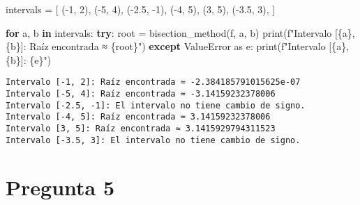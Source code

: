 \documentclass[
  letterpaper,
  DIV=11,
  numbers=noendperiod]{scrartcl}
\newenvironment{Shaded}{\begin{snugshade}}{\end{snugshade}}
\newcommand{\BuiltInTok}[1]{\textcolor[rgb]{0.00,0.23,0.31}{#1}}
\newcommand{\ControlFlowTok}[1]{\textcolor[rgb]{0.00,0.23,0.31}{\textbf{#1}}}
\newcommand{\DecValTok}[1]{\textcolor[rgb]{0.68,0.00,0.00}{#1}}
\newcommand{\FloatTok}[1]{\textcolor[rgb]{0.68,0.00,0.00}{#1}}
\newcommand{\ImportTok}[1]{\textcolor[rgb]{0.00,0.46,0.62}{#1}}
\newcommand{\KeywordTok}[1]{\textcolor[rgb]{0.00,0.23,0.31}{\textbf{#1}}}
\newcommand{\NormalTok}[1]{\textcolor[rgb]{0.00,0.23,0.31}{#1}}
\newcommand{\OperatorTok}[1]{\textcolor[rgb]{0.37,0.37,0.37}{#1}}
\newcommand{\PreprocessorTok}[1]{\textcolor[rgb]{0.68,0.00,0.00}{#1}}
\newcommand{\SpecialCharTok}[1]{\textcolor[rgb]{0.37,0.37,0.37}{#1}}
\newcommand{\SpecialStringTok}[1]{\textcolor[rgb]{0.13,0.47,0.30}{#1}}
\begin{document}
\begin{Shaded}
\begin{Highlighting}[]
\NormalTok{intervals }\OperatorTok{=}\NormalTok{ [}
\NormalTok{    (}\OperatorTok{{-}}\DecValTok{1}\NormalTok{, }\DecValTok{2}\NormalTok{),     }
\NormalTok{    (}\OperatorTok{{-}}\DecValTok{5}\NormalTok{, }\DecValTok{4}\NormalTok{),      }
\NormalTok{    (}\OperatorTok{{-}}\FloatTok{2.5}\NormalTok{, }\OperatorTok{{-}}\DecValTok{1}\NormalTok{),   }
\NormalTok{    (}\OperatorTok{{-}}\DecValTok{4}\NormalTok{, }\DecValTok{5}\NormalTok{),     }
\NormalTok{    (}\DecValTok{3}\NormalTok{, }\DecValTok{5}\NormalTok{),       }
\NormalTok{    (}\OperatorTok{{-}}\FloatTok{3.5}\NormalTok{, }\DecValTok{3}\NormalTok{),    }
\NormalTok{]}

\ControlFlowTok{for}\NormalTok{ a, b }\KeywordTok{in}\NormalTok{ intervals:}
    \ControlFlowTok{try}\NormalTok{:}
\NormalTok{        root }\OperatorTok{=}\NormalTok{ bisection\_method(f, a, b)}
        \BuiltInTok{print}\NormalTok{(}\SpecialStringTok{f"Intervalo [}\SpecialCharTok{\{}\NormalTok{a}\SpecialCharTok{\}}\SpecialStringTok{, }\SpecialCharTok{\{}\NormalTok{b}\SpecialCharTok{\}}\SpecialStringTok{]: Raíz encontrada ≈ }\SpecialCharTok{\{}\NormalTok{root}\SpecialCharTok{\}}\SpecialStringTok{"}\NormalTok{)}
    \ControlFlowTok{except} \PreprocessorTok{ValueError} \ImportTok{as}\NormalTok{ e:}
        \BuiltInTok{print}\NormalTok{(}\SpecialStringTok{f"Intervalo [}\SpecialCharTok{\{}\NormalTok{a}\SpecialCharTok{\}}\SpecialStringTok{, }\SpecialCharTok{\{}\NormalTok{b}\SpecialCharTok{\}}\SpecialStringTok{]: }\SpecialCharTok{\{}\NormalTok{e}\SpecialCharTok{\}}\SpecialStringTok{"}\NormalTok{)}
\end{Highlighting}
\end{Shaded}

\begin{verbatim}
Intervalo [-1, 2]: Raíz encontrada ≈ -2.384185791015625e-07
Intervalo [-5, 4]: Raíz encontrada ≈ -3.14159232378006
Intervalo [-2.5, -1]: El intervalo no tiene cambio de signo.
Intervalo [-4, 5]: Raíz encontrada ≈ 3.14159232378006
Intervalo [3, 5]: Raíz encontrada ≈ 3.1415929794311523
Intervalo [-3.5, 3]: El intervalo no tiene cambio de signo.
\end{verbatim}

\section{Pregunta 5}\label{pregunta-5}
\end{document}
